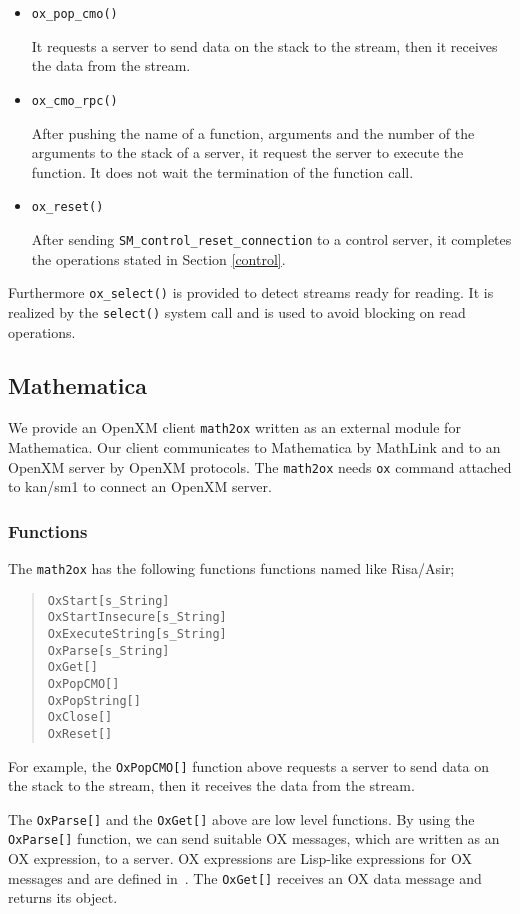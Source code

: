 \begin{itemize}
\item {\tt ox\_pop\_cmo()}

It requests a server to send data on the stack to the stream, then
it receives the data from the stream.

\item {\tt ox\_cmo\_rpc()}

After pushing the name of a function, arguments and the number of the
arguments to the stack of a server, it request the server to execute
the function. It does not wait the termination of the function call.

\item {\tt ox\_reset()}

After sending {\tt SM\_control\_reset\_connection} to a control server,
it completes the operations stated in Section \ref{control}.
\end{itemize}
Furthermore {\tt ox\_select()} is provided to detect streams ready for
reading. It is realized by the {\tt select()} system call and is used
to avoid blocking on read operations.

\subsection{Mathematica}

We provide an OpenXM client {\tt math2ox} written as an external module
for Mathematica.  Our client communicates to Mathematica by MathLink and
to an OpenXM server by OpenXM protocols.  The {\tt math2ox} needs 
{\tt ox} command attached to kan/sm1 to connect an OpenXM server.

\subsubsection{Functions}

The {\tt math2ox} has the following functions functions named 
like Risa/Asir;
\begin{quote}
{\tt OxStart[s\_String]} \\
{\tt OxStartInsecure[s\_String]} \\
{\tt OxExecuteString[s\_String]}  \\
{\tt OxParse[s\_String]} \\
{\tt OxGet[]} \\
{\tt OxPopCMO[]} \\
{\tt OxPopString[]} \\
{\tt OxClose[]} \\
{\tt OxReset[]}
\end{quote}
For example, the {\tt OxPopCMO[]} function above requests a server to
send data on the stack to the stream, then it receives the data from the
stream.

The {\tt OxParse[]} and the {\tt OxGet[]} above are low level functions.
By using the {\tt OxParse[]} function, we can send suitable OX messages,
which are written as an OX expression, to a server.  OX expressions are
Lisp-like expressions for OX messages and are defined
in~\cite{noro-takayama}.  The {\tt OxGet[]} receives an OX data message
and returns its object.
